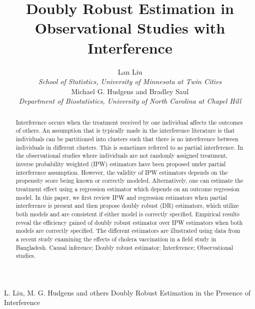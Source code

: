 \documentclass[oupdraft]{biostatistics}
\begin{document}
\title{Doubly Robust Estimation in Observational Studies with Interference}

\author{
Lan Liu\\[4pt]
\textit{School of Statistics, University of Minnesota at Twin Cities}\\
Michael G. Hudgens and Bradley Saul\\
\textit{Department of Biostatistics, University of North Carolina at Chapel Hill}}
\markboth%
{L. Liu, M. G. Hudgens and others}
{Doubly Robust Estimation in the Presence of Interference}

\maketitle


\begin{abstract}
{Interference occurs when the treatment received by one individual affects the outcomes of others. An assumption that is typically made in the interference literature is that individuals can be partitioned into
clusters such that there is no interference between individuals in different clusters. This is sometimes referred to as partial interference. In the observational studies where individuals are not randomly assigned treatment, inverse probability weighted (IPW) estimators have been proposed under partial interference assumption. However, the validity of IPW estimators depends on the propensity score being known or correctly modeled. Alternatively, one can estimate the treatment effect using a  regression estimator which depends on an outcome regression model. In this paper, we first review IPW and regression estimators when partial interference is present and then propose
doubly robust (DR) estimators, which utilize both models and are consistent if either model is correctly specified. Empirical results reveal the efficiency gained of doubly robust estimator over IPW estimators when both models are correctly specified. The different estimators are illustrated using data from a recent study examining the effects of cholera vaccination in a field study in Bangladesh.}
{Causal inference; Doubly robust estimator; Interference; Observational studies.}
\end{abstract}
\end{document}
